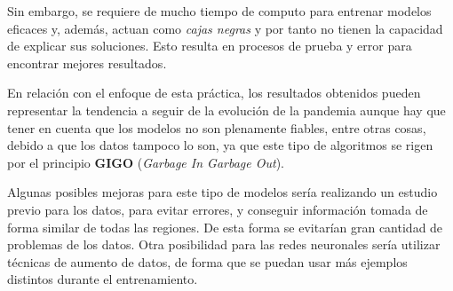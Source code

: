 \documentclass[12pt,a4paper, xcolor=table]{article}
\begin{document}
    \vspace{2mm}

    Sin embargo, se requiere de mucho tiempo de computo para entrenar modelos eficaces y, además, actuan como \textit{cajas negras} y por tanto no tienen la capacidad de explicar sus soluciones. Esto resulta en procesos de prueba y error para encontrar mejores resultados.

    \vspace{2mm}

    En relación con el enfoque de esta práctica, los resultados obtenidos pueden representar la tendencia a seguir de la evolución de la pandemia aunque hay que tener en cuenta que los modelos no son plenamente fiables, entre otras cosas, debido a que los datos tampoco lo son, ya que este tipo de algoritmos se rigen por el principio \textbf{GIGO} (\textit{Garbage In Garbage Out}).

    \vspace{2mm}

    Algunas posibles mejoras para este tipo de modelos sería realizando un estudio previo para los datos, para evitar errores, y conseguir información tomada de forma similar de todas las regiones. De esta forma se evitarían gran cantidad de problemas de los datos. Otra posibilidad para las redes neuronales sería utilizar técnicas de aumento de datos, de forma que se puedan usar más ejemplos distintos durante el entrenamiento.




\clearpage
\end{document}
